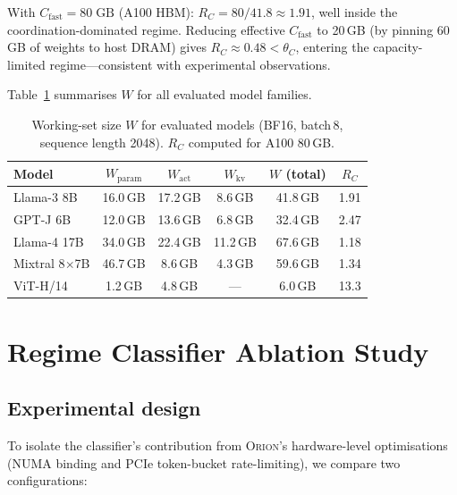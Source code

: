 With $C_{\mathrm{fast}} = 80\;\text{GB}$ (A100 HBM):
$R_C = 80/41.8 \approx 1.91$, well inside the coordination-dominated regime.
Reducing effective $C_{\mathrm{fast}}$ to 20\,GB (by pinning 60\,GB of weights
to host DRAM) gives $R_C \approx 0.48 < \theta_C$, entering the
capacity-limited regime---consistent with experimental observations.

Table~\ref{tab:W_models} summarises $W$ for all evaluated model families.

\begin{table}[h]
\centering
\caption{Working-set size $W$ for evaluated models (BF16, batch\,8,
sequence length 2048). $R_C$ computed for A100 80\,GB.}
\label{tab:W_models}
\renewcommand{\arraystretch}{1.15}
\begin{tabular}{lccccc}
\toprule
\textbf{Model} & $W_{\mathrm{param}}$ & $W_{\mathrm{act}}$ & $W_{\mathrm{kv}}$ &
$W$ (total) & $R_C$ \\
\midrule
Llama-3 8B          & 16.0\,GB & 17.2\,GB & 8.6\,GB  & 41.8\,GB & 1.91 \\
GPT-J 6B            & 12.0\,GB & 13.6\,GB & 6.8\,GB  & 32.4\,GB & 2.47 \\
Llama-4 17B         & 34.0\,GB & 22.4\,GB & 11.2\,GB & 67.6\,GB & 1.18 \\
Mixtral 8$\times$7B & 46.7\,GB &  8.6\,GB &  4.3\,GB & 59.6\,GB & 1.34 \\
ViT-H/14            &  1.2\,GB &  4.8\,GB & —        &  6.0\,GB & 13.3 \\
\bottomrule
\end{tabular}
\end{table}


\section{Regime Classifier Ablation Study}
\label{app:classifier_ablation}

\subsection{Experimental design}

To isolate the classifier's contribution from \textsc{Orion}'s hardware-level
optimisations (NUMA binding and PCIe token-bucket rate-limiting), we compare
two configurations:

